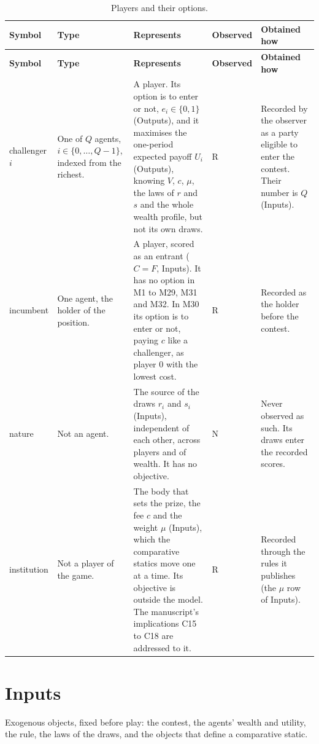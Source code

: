 \documentclass[11pt]{article}
\begin{document}
\footnotesize
\begin{longtable}{@{}P{1.9cm}P{2.4cm}P{4.5cm}P{1.7cm}P{4.7cm}@{}}
\caption{Players and their options.}\\
\toprule
\textbf{Symbol} & \textbf{Type} & \textbf{Represents} & \textbf{Observed} & \textbf{Obtained how} \\
\midrule
\endfirsthead
\toprule
\textbf{Symbol} & \textbf{Type} & \textbf{Represents} & \textbf{Observed} & \textbf{Obtained how} \\
\midrule
\endhead
\bottomrule
\endfoot
challenger $i$ & One of $Q$ agents, $i\in\{0,\dots,Q-1\}$, indexed from the
  richest. & A player. Its option is to enter or not, $e_i\in\{0,1\}$
  (Outputs), and it maximises the one-period expected payoff $U_i$ (Outputs),
  knowing $V$, $c$, $\mu$, the laws of $r$ and $s$ and the whole wealth
  profile, but not its own draws. & R & Recorded by the observer as a party
  eligible to enter the contest. Their number is $Q$ (Inputs). \\ \addlinespace
incumbent & One agent, the holder of the position. & A player, scored as an
  entrant ($C=F$, Inputs). It has no option in M1 to M29, M31 and M32. In M30
  its option is to enter or not, paying $c$ like a challenger, as player $0$
  with the lowest cost. & R & Recorded as the holder before the
  contest. \\ \addlinespace
nature & Not an agent. & The source of the draws $r_i$ and $s_i$ (Inputs),
  independent of each other, across players and of wealth. It has no
  objective. & N & Never observed as such. Its draws enter the recorded
  scores. \\ \addlinespace
institution & Not a player of the game. & The body that sets the prize, the fee
  $c$ and the weight $\mu$ (Inputs), which the comparative statics move one at a
  time. Its objective is outside the model. The manuscript's implications C15
  to C18 are addressed to it. & R & Recorded through the rules it publishes
  (the $\mu$ row of Inputs). \\
\end{longtable}
\normalsize

\section*{Inputs}

Exogenous objects, fixed before play: the contest, the agents' wealth and utility, the rule, the
laws of the draws, and the objects that define a comparative static.
\end{document}

